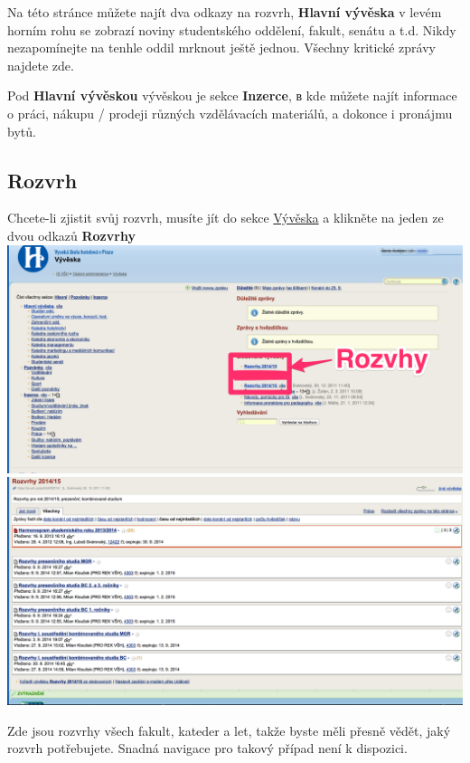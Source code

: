 \documentclass[a4paper,12pt]{article}
\begin{document}
Na této stránce můžete najít dva odkazy na rozvrh, \textbf{Hlavní vývěska} 
v levém horním rohu se zobrazí noviny studentského oddělení, 
fakult, senátu a t.d. Nikdy nezapomínejte na tenhle oddil mrknout ještě jednou. 
Všechny kritické zprávy najdete zde.

Pod \textbf{Hlavní vývěskou} vývěskou je sekce \textbf{Inzerce}, в 
kde můžete najít informace o práci, 
nákupu / prodeji různých vzdělávacích materiálů, a dokonce i pronájmu bytů.

\newpage

\subsection{Rozvrh}
Chcete-li zjistit svůj rozvrh, musíte jít do sekce \href{https://is.vsh.cz/auth/vyveska/}{Vývěska}
a klikněte na jeden ze dvou odkazů \textbf{Rozvrhy} \\

\includegraphics[width=\textwidth]{s13-1} \\

\includegraphics[width=\textwidth]{s14} \\

\newpage

Zde jsou rozvrhy všech fakult, kateder a let, takže byste měli přesně vědět, 
jaký rozvrh potřebujete. 
Snadná navigace pro takový případ není k dispozici. \\
\end{document}
